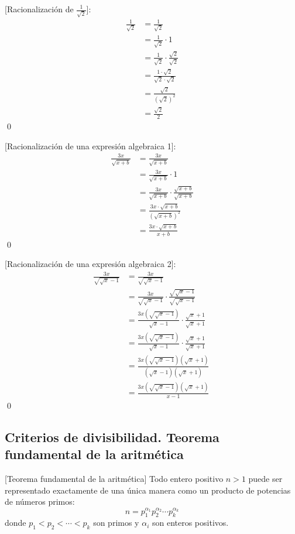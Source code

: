 	[Racionalización de \(\frac{1}{\sqrt 2 }\)]: 
	\begin{align}
		\frac{1}{\sqrt{2}} &= \frac{1}{\sqrt{2}} \\
		&= \frac{1}{\sqrt{2}} \cdot 1 \\
		&= \frac{1}{\sqrt{2}} \cdot \frac{\sqrt{2}}{\sqrt{2}} \\
		&= \frac{1 \cdot \sqrt{2}}{\sqrt{2} \cdot \sqrt{2}} \\
		&= \frac{\sqrt{2}}{(\sqrt{2})^2} \\
		&= \frac{\sqrt{2}}{2} 
	\end{align}
	\qed

	[Racionalización de una expresión algebraica 1]: 
	\begin{align}
		\frac{3x}{\sqrt{x+b}} &= \frac{3x}{\sqrt{x+b}} \\
		&= \frac{3x}{\sqrt{x+b}} \cdot 1 \\
\		&= \frac{3x}{\sqrt{x+b}} \cdot \frac{\sqrt{x+b}}{\sqrt{x+b}} \\
		&= \frac{3x \cdot \sqrt{x+b}}{(\sqrt{x+b})^2} \\
		&= \frac{3x \cdot \sqrt{x+b}} {x+b} 
	\end{align}
	\qed

	[Racionalización de una expresión algebraica 2]:
	\begin{align}
		\frac{3x}{\sqrt{\sqrt{x} - 1}} &= \frac{3x}{\sqrt{\sqrt{x} - 1}} \\
		&= \frac{3x}{\sqrt{\sqrt{x} - 1}} \cdot \frac{\sqrt{\sqrt{x} - 1}}{\sqrt{\sqrt{x} - 1}} \\
		&= \frac{3x (\sqrt{\sqrt{x} - 1})} {\sqrt{x} - 1} \cdot \frac{\sqrt{x} + 1}{\sqrt{x} + 1} \\
		&= \frac{3x (\sqrt{\sqrt{x} - 1})} {\sqrt{x} - 1} \cdot \frac{\sqrt{x} + 1}{\sqrt{x} + 1} \\
		&= \frac{3x (\sqrt{\sqrt{x} - 1})(\sqrt{x} + 1)} {(\sqrt{x} - 1)(\sqrt{x} + 1)} \\
		&= \frac{3x (\sqrt{\sqrt{x} - 1})(\sqrt{x} + 1)} {x-1} \
	\end{align}
	\qed

\subsection{Criterios de divisibilidad. Teorema fundamental de la aritmética}


	[Teorema fundamental de la aritmética] Todo entero positivo \(n > 1\) puede ser representado exactamente de una única manera como un producto de potencias de números primos:
	\[
    	n = p_1^{\alpha_1} p_2^{\alpha_2} \cdots p_k^{\alpha_k}
	\]
	donde \(p_1 < p_2 < \cdots < p_k\) son primos y \(\alpha_i\) son enteros positivos. 


